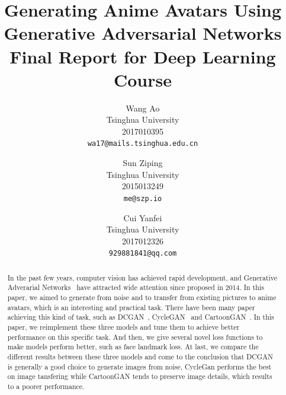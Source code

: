 \documentclass[10pt,twocolumn,letterpaper]{article}
\begin{document}
\title{Generating Anime Avatars Using Generative Adversarial Networks \\
\large Final Report for Deep Learning Course}

\author{Wang Ao\\
Tsinghua University\\
2017010395\\
{\tt\small wa17@mails.tsinghua.edu.cn}
\and
Sun Ziping\\
Tsinghua University\\
2015013249\\
{\tt\small me@szp.io}
\and
Cui Yanfei\\
Tsinghua University\\
2017012326\\
{\tt\small 929881841@qq.com}
}

\maketitle

\begin{abstract}
In the past few years, computer vision has achieved rapid development, and
Generative Adverarial Networks~\cite{GAN} have attracted wide attention since
proposed in 2014. In this paper, we aimed to generate from noise and to transfer
from existing pictures to anime avatars, which is an interesting and practical
task. There have been many paper achieving this kind of task, such as
DCGAN~\cite{DCGAN}, CycleGAN~\cite{CycleGAN2017} and
CartoonGAN~\cite{CartoonGAN}. In this paper, we reimplement these three models
and tune them to achieve better performance on this specific task. And then, we
give several novel loss functions to make models perform better, such as face
landmark loss. At last, we compare the different results between these three
models and come to the conclusion that DCGAN is generally a good choice to
generate images from noise, CycleGan performs the best on image tansfering while
CartoonGAN tends to preserve image details, which results to a poorer
performance.
\end{abstract}

\end{document}
